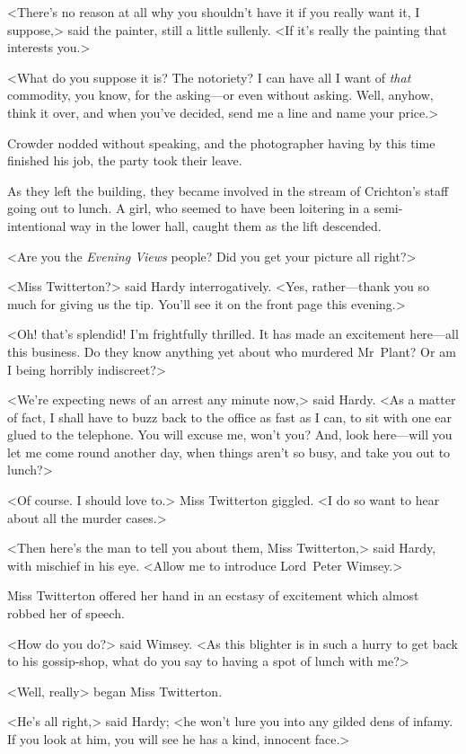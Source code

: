 <There's no reason at all why you shouldn't have it if you really want it, I suppose,> said the painter, still a little sullenly. <If it's really the painting that interests you.>

<What do you suppose it is? The notoriety? I can have all I want of \textit{that} commodity, you know, for the asking—or even without asking. Well, anyhow, think it over, and when you've decided, send me a line and name your price.>

Crowder nodded without speaking, and the photographer having by this time finished his job, the party took their leave.

As they left the building, they became involved in the stream of Crichton's staff going out to lunch. A girl, who seemed to have been loitering in a semi-intentional way in the lower hall, caught them as the lift descended.

<Are you the \textit{Evening Views} people? Did you get your picture all right?>

<Miss Twitterton?> said Hardy interrogatively. <Yes, rather—thank you so much for giving us the tip. You'll see it on the front page this evening.>

<Oh! that's splendid! I'm frightfully thrilled. It has made an excitement here—all this business. Do they know anything yet about who murdered Mr~Plant? Or am I being horribly indiscreet?>

<We're expecting news of an arrest any minute now,> said Hardy. <As a matter of fact, I shall have to buzz back to the office as fast as I can, to sit with one ear glued to the telephone. You will excuse me, won't you? And, look here—will you let me come round another day, when things aren't so busy, and take you out to lunch?>

<Of course. I should love to.> Miss Twitterton giggled. <I do so want to hear about all the murder cases.>

<Then here's the man to tell you about them, Miss Twitterton,> said Hardy, with mischief in his eye. <Allow me to introduce Lord~Peter Wimsey.>

Miss Twitterton offered her hand in an ecstasy of excitement which almost robbed her of speech.

<How do you do?> said Wimsey. <As this blighter is in such a hurry to get back to his gossip-shop, what do you say to having a spot of lunch with me?>

<Well, really\longdash> began Miss Twitterton.

<He's all right,> said Hardy; <he won't lure you into any gilded dens of infamy. If you look at him, you will see he has a kind, innocent face.>

